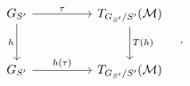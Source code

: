 \[\begin{tikzcd}[column sep=huge,row sep=large]
G_{S'} \arrow[r,"\tau"] \arrow[d,"h"'] & T_{G_{S'}/S'}(\mathcal M) \arrow[d,"T(h)"]\\
G_{S'} \arrow[r,"h(\tau)"] & T_{G_{S'}/S'}(\mathcal M)
\end{tikzcd}\quad .\]
